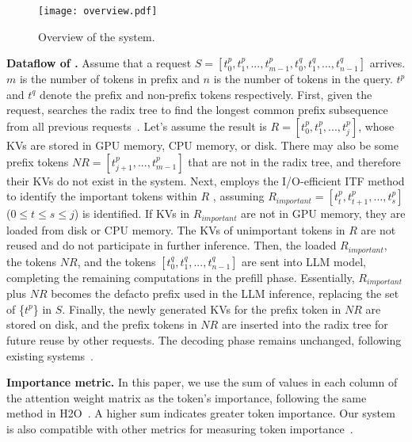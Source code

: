 \begin{figure}
	\centering
	\texttt{[image: overview.pdf]}
	\caption{Overview of the \pname{} system.}
	\label{fig:overview}
	\vspace{-0.2in}
\end{figure}


\noindent \textbf{Dataflow of \pname{}.} 
Assume that a request $S=[t^p_0, t^p_1,...,t^p_{m-1}, t^q_0, t^q_1,...,t^q_{n-1}]$ arrives.
$m$ is the number of tokens in prefix and $n$ is the number of tokens in the query.
$t^p$ and $t^q$ denote the prefix and non-prefix tokens respectively. 
First, given the request, \pname{} searches the radix tree to find the longest common 
prefix subsequence from all previous requests~\cite{sglang-arxiv23, chunkattention-arxiv24}. 
Let's assume the result is  
$R=[t^p_0, t^p_1, ..., t^p_j]$, whose KVs are
stored in GPU memory, CPU memory, or disk.
There may also be some prefix tokens \( NR = [t^p_{j+1}, ..., t^p_{m-1}] \) that are not in the radix tree, and therefore their KVs do not exist in the system.
Next, \pname{} employs the I/O-efficient ITF method to identify 
the important tokens within $R$ , assuming $R_{important}=[t^p_{t}, t^p_{t+1}, ..., t^p_s]$ 
($ 0 \leq t \leq s \leq j$) is identified.
If KVs in $R_{important}$ are not in GPU memory, they are loaded from disk or CPU memory. 
The KVs of unimportant tokens in $R$ are not reused and do not participate in further inference.
Then, the loaded $R_{important}$, the tokens $NR$, and the tokens $[t^q_0, t^q_1,...,t^q_{n-1}]$   
are sent into LLM model, completing the remaining computations in the prefill phase.
Essentially, $R_{important}$ plus $NR$ becomes the defacto prefix used in the LLM inference,
replacing the set of \{$t^p$\} in $S$.
Finally, the newly generated KVs for the prefix token in $NR$ are stored on disk, 
and the prefix tokens in $NR$ are inserted into the radix tree for future reuse by other requests. 
The decoding phase remains unchanged, following existing systems~\cite{alluneed-nips17}.

\noindent \textbf{Importance metric.} 
In this paper, we use the sum of values
in each column of the attention weight matrix as the token's importance,
following the same method in H2O~\cite{h2o-nips23}. A higher sum indicates greater
token importance. Our system is also compatible with other metrics for measuring
token importance~\cite{scissorhands-nips23, flexgen-icml23, infinigen-osdi24}.

